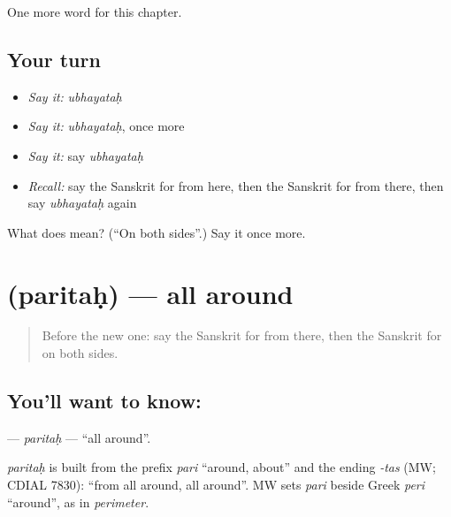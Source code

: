 \begin{grammarlens}[title={What you've built}]
One more word for this chapter.
\end{grammarlens}

\subsection*{Your turn}
\begin{itemize}
\raggedright
  \item \emph{Say it:} \emph{ubhayataḥ}
  \item \emph{Say it:} \emph{ubhayataḥ}, once more
  \item \emph{Say it:} say \emph{ubhayataḥ}
  \item \emph{Recall:} say the Sanskrit for from here, then the Sanskrit for from there, then say \emph{ubhayataḥ} again
\end{itemize}

\begin{tcolorbox}[breakable,colback=teal!4,colframe=teal!35!black,title={Before you move on}]
What does  mean? (\textquotedblleft{}On both sides\textquotedblright{}.) Say it once more.
\end{tcolorbox}
\section[\texorpdfstring{\sk{परितः} (paritaḥ)}{परितः (paritaḥ)}]{ (paritaḥ) — all around}

\label{lesson:SA-C153-paritah}



\begin{quote}
Before the new one: say the Sanskrit for from there, then the Sanskrit for on both sides.
\end{quote}

\subsection*{You'll want to know: }
\textbf{} — \emph{paritaḥ} — \textquotedblleft{}all around\textquotedblright{}.

\begin{cousinweb}
\emph{paritaḥ} is built from the prefix \emph{pari} \textquotedblleft{}around, about\textquotedblright{} and the ending \emph{-tas} (MW; CDIAL 7830): \textquotedblleft{}from all around, all around\textquotedblright{}. MW sets \emph{pari} beside Greek \emph{peri} \textquotedblleft{}around\textquotedblright{}, as in \emph{perimeter}.
\end{cousinweb}

